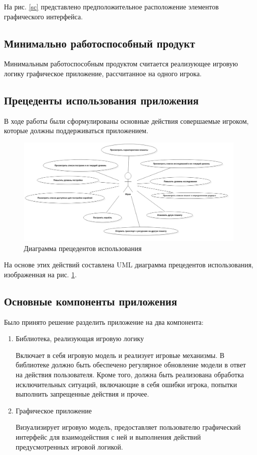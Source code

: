 На рис. \ref{sc} представлено предположительное расположение элементов графического интерфейса.

\subsection{Минимально работоспособный продукт}
Минимальным работоспособным продуктом считается реализующее игровую логику графическое приложение, рассчитанное на одного игрока.

\subsection{Прецеденты использования приложения}

В ходе работы были сформулированы основные действия совершаемые игроком, которые должны поддерживаться приложением. 
\begin{figure}[H]
	\begin{center}
		\includegraphics[scale=0.35]{../../uml/UseCaseDiagram1.png}
		\caption{Диаграмма прецедентов использования}
		\label{pic:use_case}
	\end{center}
\end{figure}

На основе этих действий составлена UML диаграмма прецедентов использования, изображенная на рис. \ref{pic:use_case}.

\subsection{Основные компоненты приложения}

Было принято решение разделить приложение на два компонента:

\begin{enumerate}
	\item Библиотека, реализующая игровую логику
		
	 Включает в себя игровую модель и реализует игровые механизмы. В библиотеке должно быть обеспечено регулярное обновление модели в ответ на действия пользователя. Кроме того, должна быть реализована обработка исключительных ситуаций, включающие в себя ошибки игрока, попытки выполнить запрещенные действия и прочее. 	 
	
	\item Графическое приложение 

	Визуализирует игровую модель, предоставляет пользователю графический интерфейс для взаимодействия с ней и выполнения действий предусмотренных игровой логикой.
\end{enumerate}

